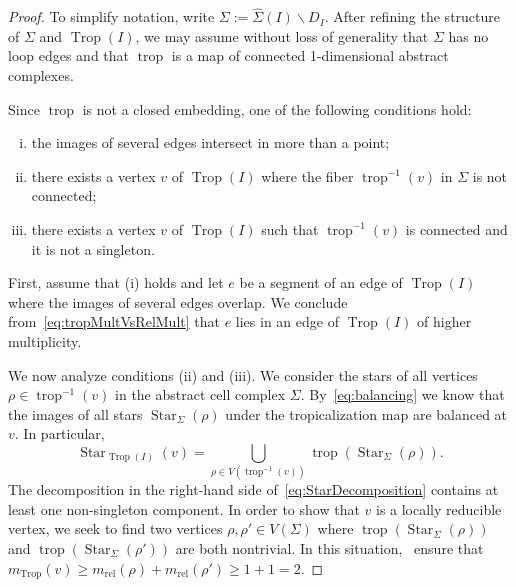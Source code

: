 \documentclass[11pt]{amsart}
\numberwithin{equation}{section}
\theoremstyle{plain}
\theoremstyle{definition}
\theoremstyle{remark}
\begin{document}
\begin{proof} To simplify notation, write
  $\Sigma:=\widehat{\Sigma}(I)\smallsetminus D_I$. After refining the
  structure of $\Sigma$ and $\operatorname{Trop}(I)$, we may assume without loss of
  generality that $\Sigma$ has no loop edges and that $\operatorname{trop}$ is a map
  of connected 1-dimensional abstract complexes.

  Since $\operatorname{trop}$ is not a closed embedding, one of the following
  conditions hold:
  \begin{enumerate}[(i)]
  \item the images of several edges intersect in
  more than a point;
\item there exists a vertex $v$ of $\operatorname{Trop}(I)$ where the fiber
  $\operatorname{trop}^{-1}(v)$ in $\Sigma$ is not connected;
\item there exists a vertex $v$ of $\operatorname{Trop}(I)$ such that $\operatorname{trop}^{-1}(v)$ is connected and it is not a singleton.
  \end{enumerate}

  First, assume that (i) holds and let $e$ be a segment of an edge of
  $\operatorname{Trop}(I)$ where the images of several edges overlap. We conclude
  from~\eqref{eq:tropMultVsRelMult} that $e$ lies in an edge of
  $\operatorname{Trop}(I)$ of higher multiplicity.

We now analyze conditions (ii) and (iii).
We consider the
  stars of all vertices $\rho\in \operatorname{trop}^{-1}(v)$ in the abstract cell
  complex $\Sigma$.  By~\eqref{eq:balancing} we know that the images
  of all stars $\operatorname{\ensuremath{Star}}_{\Sigma}(\rho)$ under the tropicalization map
  are balanced at $v$. In particular, 
\begin{equation}
\operatorname{\ensuremath{Star}}_{\operatorname{Trop}(I)}(v)= \bigcup_{\rho \in V(\operatorname{trop}^{-1}(v))} \operatorname{trop}(\operatorname{\ensuremath{Star}}_{\Sigma}(\rho)).\label{eq:StarDecomposition}
\end{equation}
The decomposition in the right-hand side
of~\eqref{eq:StarDecomposition} contains at least one non-singleton
component. In order to show that $v$ is a locally reducible vertex, we
seek to find two vertices $\rho,\rho'\in V(\Sigma)$ where
$\operatorname{trop}(\operatorname{\ensuremath{Star}}_{\Sigma}(\rho))$ and $\operatorname{trop}(\operatorname{\ensuremath{Star}}_{\Sigma}(\rho'))$ are
both nontrivial. In this situation,~\cite[Proposition 4.24, Corollary
6.12]{BPR11} ensure that $m_\operatorname{Trop}(v)\geq
m_{\operatorname{rel}}(\rho) +m_{\operatorname{rel}}(\rho')\geq
1+1=2$.


\end{proof}
\end{document}
